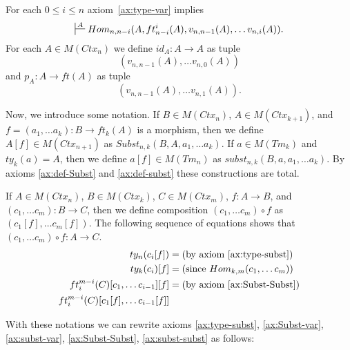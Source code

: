 \documentclass[reqno]{amsart}
\theoremstyle{definition}
\theoremstyle{remark}
\numberwithin{figure}{section}
\begin{document}
For each $0 \leq i \leq n$ axiom~\eqref{ax:type-var} implies
\[ \sststile{}{A} Hom_{n,n-i}(A, ft^i_{n-i}(A), v_{n,n-1}(A), \ldots v_{n,i}(A)). \]
For each $A \in M(Ctx_n)$ we define $id_A : A \to A$ as tuple
\[ (v_{n,n-1}(A), \ldots v_{n,0}(A)) \]
and $p_A : A \to ft(A)$ as tuple
\[ (v_{n,n-1}(A), \ldots v_{n,1}(A)). \]

Now, we introduce some notation.
If $B \in M(Ctx_n)$, $A \in M(Ctx_{k+1})$, and $f = (a_1, \ldots a_k) : B \to ft_k(A)$ is a morphism, then we define $A[f] \in M(Ctx_{n+1})$ as $Subst_{n,k}(B, A, a_1, \ldots a_k)$.
If $a \in M(Tm_k)$ and $ty_k(a) = A$, then we define $a[f] \in M(Tm_n)$ as $subst_{n,k}(B, a, a_1, \ldots a_k)$.
By axioms \eqref{ax:def-Subst} and \eqref{ax:def-subst} these constructions are total.

If $A \in M(Ctx_n)$, $B \in M(Ctx_k)$, $C \in M(Ctx_m)$, $f : A \to B$, and $(c_1, \ldots c_m) : B \to C$, then we define composition $(c_1, \ldots c_m) \circ f$ as $(c_1[f], \ldots c_m[f])$.
The following sequence of equations shows that $(c_1, \ldots c_m) \circ f : A \to C$.
\begin{align*}
ty_n(c_i[f]) & = \text{(by axiom~\eqref{ax:type-subst})} \\
ty_k(c_i)[f] & = \text{(since $Hom_{k,m}(c_1, \ldots c_m)$)} \\
ft^{m-i}_i(C)[c_1, \ldots c_{i-1}][f] & = \text{(by axiom~\eqref{ax:Subst-Subst})} \\
ft^{m-i}_i(C)[c_1[f], \ldots c_{i-1}[f]] &
\end{align*}

With these notations we can rewrite axioms \eqref{ax:type-subst}, \eqref{ax:Subst-var}, \eqref{ax:subst-var}, \eqref{ax:Subst-Subst}, \eqref{ax:subst-subst} as follows:
\begin{comment}
\begin{align}
\setcounter{equation}{\ref{ax:type-subst}}
\addtocounter{equation}{-1}
ty_n(a[f]) & = A[f] \\ \notag
\text{ for each } f : B \to ft_k(A) & \text{ where } A = ty_k(a) \\
A[id_{ft_n(A)}] & = A \\
a[id_{ft_n(ty_n(a))}] & = a \\
\setcounter{equation}{\ref{ax:Subst-Subst}}
\addtocounter{equation}{-1}
A[g][f] & = A[g \circ f] \\ \notag
\text{ for each } f : C \to B \text{ and } & g : B \to ft_m(A) \\
a[g][f] & = a[g \circ f] \\ \notag
\text{ for each } f : C \to B \text{ and } & g : B \to ft_m(ty_m(a))
\end{align}
\end{comment}
\end{document}

